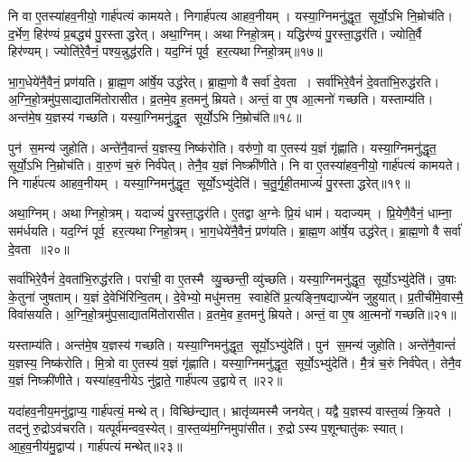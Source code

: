नि वा ए॒तस्या॑हव॒नीयो॒ गार्\mbox{}ह॑पत्यं कामयते। निगार्\mbox{}ह॑पत्य आहव॒नीयम्। यस्या॒ग्निमनु॑द्धृत॒ सूर्यो॒ऽभि नि॒म्रोच॑ति। द॒र्भेण॒ हिर॑ण्यं प्र॒बद्ध्य॑ पु॒रस्ताद्धरेत्। अथा॒ग्निम्। अथाग्निहो॒त्रम्। यद्धिर॑ण्यं पु॒रस्ता॒द्धर॑ति। ज्योति॒र्वै हिर॑ण्यम्। ज्योति॑रे॒वैनं॒ पश्य॒न्नुद्ध॑रति। यद॒ग्निं पूर्व॒ हर॒त्यथाग्निहो॒त्रम्॥१७॥

भा॒ग॒धेये॑नै॒वैनं॒ प्रण॑यति। ब्रा॒ह्म॒ण आ॑र्\mbox{}षे॒य उद्ध॑रेत्। ब्रा॒ह्म॒णो वै सर्वा॑ दे॒वता। सर्वा॑भिरे॒वैनं॑ दे॒वता॑भि॒रुद्ध॑रति। अ॒ग्नि॒हो॒त्रमु॑प॒साद्यातमि॑तोरासीत। व्र॒तमे॒व ह॒तमनु॑ म्रियते। अन्तं॒ वा ए॒ष आ॒त्मनो॑ गच्छति। यस्ताम्य॑ति। अन्त॑मे॒ष य॒ज्ञस्य॑ गच्छति। यस्या॒ग्निमनु॑द्धृ॒त सूर्यो॒ऽभि नि॒म्रोच॑ति॥१८॥

पुन॑ स॒मन्य॑ जुहोति। अन्ते॑नै॒वान्तं॑ य॒ज्ञस्य॒ निष्क॑रोति। वरु॑णो॒ वा ए॒तस्य॑ य॒ज्ञं गृ॑ह्णाति। यस्या॒ग्निमनु॑द्धृत॒ सूर्यो॒ऽभि नि॒म्रोच॑ति। वा॒रु॒णं च॒रुं निर्व॑पेत्। तेनै॒व य॒ज्ञं निष्क्री॑णीते। नि वा ए॒तस्या॑हव॒नीयो॒ गार्\mbox{}ह॑पत्यं कामयते। नि गार्\mbox{}ह॑पत्य आहव॒नीयम्। यस्या॒ग्निमनु॑द्धृत॒ सूर्यो॒ऽभ्यु॑देति॑। च॒तु॒र्गृ॒ही॒तमाज्यं॑ पु॒रस्ताद्धरेत्॥१९॥

अथा॒ग्निम्। अथाग्निहो॒त्रम्। यदाज्यं॑ पु॒रस्ता॒द्धर॑ति। ए॒तद्वा अ॒ग्नेः प्रि॒यं धाम॑। यदाज्यम्। प्रि॒येणै॒वैनं॒ धाम्ना॒ सम॑र्धयति। यद॒ग्निं पूर्व॒ हर॒त्यथाग्निहो॒त्रम्। भा॒ग॒धेये॑नै॒वैनं॒ प्रण॑यति। ब्रा॒ह्म॒ण आ॑र्\mbox{}षे॒य उद्ध॑रेत्। ब्रा॒ह्म॒णो वै सर्वा॑ दे॒वता॥२०॥

सर्वा॑भिरे॒वैनं॑ दे॒वता॑भि॒रुद्ध॑रति। परा॑ची॒ वा ए॒तस्मै व्यु॒च्छन्ती॒ व्यु॑च्छति। यस्या॒ग्निमनु॑द्धृत॒ सूर्यो॒ऽभ्यु॑देति॑। उ॒षाः के॒तुना॑ जुषताम्। य॒ज्ञं दे॒वेभि॑रिन्वि॒तम्। दे॒वेभ्यो॒ मधु॑मत्तम॒ स्वाहेति॑ प्र॒त्यङ्नि॒षद्याज्ये॑न जुहुयात्। प्र॒तीची॑मे॒वास्मै॒ विवा॑सयति। अ॒ग्नि॒हो॒त्रमु॑प॒साद्यातमि॑तोरासीत। व्र॒तमे॒व ह॒तमनु॑ म्रियते। अन्तं॒ वा ए॒ष आ॒त्मनो॑ गच्छति॥२१॥

यस्ताम्य॑ति। अन्त॑मे॒ष य॒ज्ञस्य॑ गच्छति। यस्या॒ग्निमनु॑द्धृत॒ सूर्यो॒ऽभ्यु॑देति॑। पुन॑ स॒मन्य॑ जुहोति। अन्ते॑नै॒वान्तं॑ य॒ज्ञस्य॒ निष्क॑रोति। मि॒त्रो वा ए॒तस्य॑ य॒ज्ञं गृ॑ह्णाति। यस्या॒ग्निमनु॑द्धृत॒ सूर्यो॒ऽभ्यु॑देति॑। मै॒त्रं च॒रुं निर्व॑पेत्। तेनै॒व य॒ज्ञं निष्क्री॑णीते। यस्या॑हव॒नीयेऽ नु॑द्वाते॒ गार्\mbox{}ह॑पत्य उ॒द्वायेत् ॥२२॥

यदा॑हव॒नीय॒मनु॑द्वाप्य॒ गार्\mbox{}ह॑पत्यं॒ मन्थेत्। विच्छि॑न्द्यात्। भ्रातृ॑व्यमस्मै जनयेत्। यद्वै य॒ज्ञस्य॑ वास्त॒व्यं॑ क्रि॒यते। तदनु॑ रु॒द्रोऽव॑चरति। यत्पूर्व॑मन्वव॒स्येत्। वा॒स्त॒व्य॑म॒ग्निमुपा॑सीत। रु॒द्रोऽस्य प॒शून्घातु॑कः स्यात्। आ॒ह॒व॒नीय॑मु॒द्वाप्य॑। गार्\mbox{}ह॑पत्यं मन्थेत्॥२३॥

